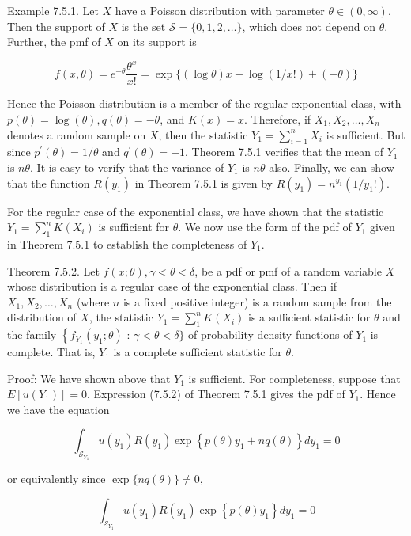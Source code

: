 Example 7.5.1. Let $X$ have a Poisson distribution with parameter $\theta \in(0, \infty)$. Then the support of $X$ is the set $\mathcal{S}=\{0,1,2, \ldots\}$, which does not depend on $\theta$. Further, the pmf of $X$ on its support is

$$
f(x, \theta)=e^{-\theta} \frac{\theta^{x}}{x!}=\exp \{(\log \theta) x+\log (1 / x!)+(-\theta)\}
$$

Hence the Poisson distribution is a member of the regular exponential class, with $p(\theta)=\log (\theta), q(\theta)=-\theta$, and $K(x)=x$. Therefore, if $X_{1}, X_{2}, \ldots, X_{n}$ denotes a random sample on $X$, then the statistic $Y_{1}=\sum_{i=1}^{n} X_{i}$ is sufficient. But since $p^{\prime}(\theta)=1 / \theta$ and $q^{\prime}(\theta)=-1$, Theorem 7.5.1 verifies that the mean of $Y_{1}$ is $n \theta$. It is easy to verify that the variance of $Y_{1}$ is $n \theta$ also. Finally, we can show that the function $R\left(y_{1}\right)$ in Theorem 7.5.1 is given by $R\left(y_{1}\right)=n^{y_{1}}\left(1 / y_{1}!\right)$.

For the regular case of the exponential class, we have shown that the statistic $Y_{1}=\sum_{1}^{n} K\left(X_{i}\right)$ is sufficient for $\theta$. We now use the form of the pdf of $Y_{1}$ given in Theorem 7.5.1 to establish the completeness of $Y_{1}$.

Theorem 7.5.2. Let $f(x ; \theta), \gamma<\theta<\delta$, be a pdf or pmf of a random variable $X$ whose distribution is a regular case of the exponential class. Then if $X_{1}, X_{2}, \ldots, X_{n}$ (where $n$ is a fixed positive integer) is a random sample from the distribution of $X$, the statistic $Y_{1}=\sum_{1}^{n} K\left(X_{i}\right)$ is a sufficient statistic for $\theta$ and the family $\left\{f_{Y_{1}}\left(y_{1} ; \theta\right)\right.$ : $\gamma<\theta<\delta\}$ of probability density functions of $Y_{1}$ is complete. That is, $Y_{1}$ is a complete sufficient statistic for $\theta$.

Proof: We have shown above that $Y_{1}$ is sufficient. For completeness, suppose that $E\left[u\left(Y_{1}\right)\right]=0$. Expression (7.5.2) of Theorem 7.5.1 gives the pdf of $Y_{1}$. Hence we have the equation

$$
\int_{\mathcal{S}_{Y_{1}}} u\left(y_{1}\right) R\left(y_{1}\right) \exp \left\{p(\theta) y_{1}+n q(\theta)\right\} d y_{1}=0
$$

or equivalently since $\exp \{n q(\theta)\} \neq 0$,

$$
\int_{\mathcal{S}_{Y_{1}}} u\left(y_{1}\right) R\left(y_{1}\right) \exp \left\{p(\theta) y_{1}\right\} d y_{1}=0
$$

